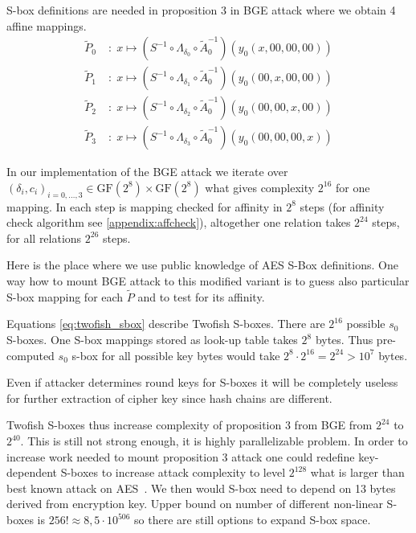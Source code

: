 \documentclass[11pt,oneside,final]{fithesis2}
\newcommand{\gfe}{\ensuremath{\text{GF}\left(2^8\right)}}
\begin{document}
    S-box definitions are needed in proposition 3 in BGE attack where we obtain 4 affine mappings.
    \begin{subequations}\label{eq:BGE_prop3}
    \begin{align}
	\widetilde{P}_0 \;&: \; x \mapsto \left( S^{-1} \circ \Lambda_{\delta_0} \circ \widetilde{A}_0^{-1}\right) \left( y_0\left(x, 00, 00, 00\right) \right)\\
	\widetilde{P}_1 \;&: \; x \mapsto \left( S^{-1} \circ \Lambda_{\delta_1} \circ \widetilde{A}_0^{-1}\right) \left( y_0\left(00, x, 00, 00\right) \right)\\
	\widetilde{P}_2 \;&: \; x \mapsto \left( S^{-1} \circ \Lambda_{\delta_2} \circ \widetilde{A}_0^{-1}\right) \left( y_0\left(00, 00, x, 00\right) \right)\\
	\widetilde{P}_3 \;&: \; x \mapsto \left( S^{-1} \circ \Lambda_{\delta_3} \circ \widetilde{A}_0^{-1}\right) \left( y_0\left(00, 00, 00, x\right) \right)
    \end{align}
    \end{subequations}
    
    In our implementation of the BGE attack we iterate over $\left(\delta_i, c_i\right)_{i=0,\dots,3} \in \gfe \times \gfe$ what gives complexity $2^{16}$ for one mapping.
    In each step is mapping checked for affinity in $2^8$ steps (for affinity check algorithm see \ref{appendix:affcheck}), altogether one relation takes $2^{24}$ steps, for all relations
    $2^{26}$ steps.
    
    Here is the place where we use public knowledge of AES S-Box definitions. One way how to mount BGE attack to this modified variant is to guess also particular S-box
    mapping for each $\widetilde{P}$ and to test for its affinity. 
    
    Equations \ref{eq:twofish_sbox} describe Twofish S-boxes. There are $2^{16}$ possible $s_0$ S-boxes. One S-box mappings stored as look-up table takes $2^8$ bytes.
    Thus pre-computed $s_0$ s-box for all possible key bytes would take $2^8 \cdot 2^{16} = 2^{24} > 10^7$ bytes. 
    
    Even if attacker determines round keys for S-boxes it will be completely useless for further extraction of cipher key since hash chains are different. 
    
    Twofish S-boxes thus increase complexity of proposition 3 from BGE from $2^{24}$ to $2^{40}$. This is still not strong enough, it is highly parallelizable problem.
    In order to increase work needed to mount proposition 3 attack one could redefine key-dependent S-boxes to increase attack complexity to level $2^{128}$ what is larger
    than best known attack on AES~\citep{cryptoeprint:2011:449}. We then would S-box need to depend on 13 bytes derived from encryption key. Upper bound on number of different non-linear S-boxes is $256! \approx 8,5\cdot 10^{506}$ so there are still options to expand 
    S-box space. 
    
\end{document}
